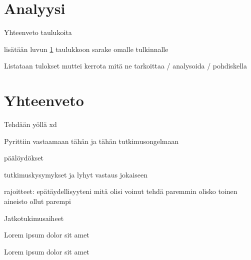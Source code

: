 \documentclass[bscthesis,finnish,oneside,biblatex]{uefcsthesis}
\begin{document}
\chapter{Analyysi}
\label{cha:analyysi}

Yhteenveto taulukoita

lisätään luvun \ref{cha:analyysi} taulukkoon sarake omalle tulkinnalle

Listataan tulokset muttei kerrota mitä ne tarkoittaa / analysoida / pohdiskella


\chapter{Yhteenveto}
\label{cha:yhteenveto}

Tehdään yöllä xd

Pyrittiin vastaamaan tähän ja tähän tutkimusongelmaan

päälöydökset

tutkimuskysymykset ja lyhyt vastaus jokaiseen

rajoitteet:
epätäydellisyyteni
mitä olisi voinut tehdä paremmin
olisko toinen aineisto ollut parempi

Jatkotukimusaiheet

Lorem ipsum dolor sit amet\citep{zafari2019survey}

\citet{zafari2019survey} Lorem ipsum dolor sit amet

\printbibliography[heading=bibintoc]

\backmatter %
\end{document}
